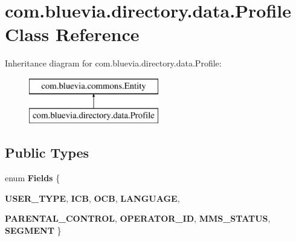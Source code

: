 \hypertarget{classcom_1_1bluevia_1_1directory_1_1data_1_1Profile}{
\section{com.bluevia.directory.data.Profile Class Reference}
\label{classcom_1_1bluevia_1_1directory_1_1data_1_1Profile}
}
Inheritance diagram for com.bluevia.directory.data.Profile:\begin{figure}[H]
\begin{center}
\leavevmode
\includegraphics[height=2.000000cm]{classcom_1_1bluevia_1_1directory_1_1data_1_1Profile}
\end{center}
\end{figure}
\subsection*{Public Types}
\begin{DoxyCompactItemize}
\item 
enum {\bfseries Fields} \{ \par
{\bfseries USER\_\-TYPE}, 
{\bfseries ICB}, 
{\bfseries OCB}, 
{\bfseries LANGUAGE}, 
\par
{\bfseries PARENTAL\_\-CONTROL}, 
{\bfseries OPERATOR\_\-ID}, 
{\bfseries MMS\_\-STATUS}, 
{\bfseries SEGMENT}
 \}
\end{DoxyCompactItemize}
